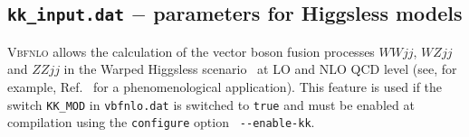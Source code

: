 \documentclass[english,12pt]{article}
\begin{document}

\subsection{{\tt kk\_input.dat} $-$ parameters for Higgsless models}

\textsc{Vbfnlo} allows the calculation of the vector boson fusion processes
$WWjj$, $WZjj$ and $ZZjj$ in the Warped Higgsless scenario~\cite{Csaki:2003zu,
Englert:2008wp} at LO and NLO QCD level (see, for example,
Ref.~\cite{Englert:2008tn} for a phenomenological application). This feature is
used if the switch {\tt KK\_MOD} in {\tt vbfnlo.dat} is switched to {\tt true}
and must be enabled at compilation using the {\tt configure} option {\tt
-{}-enable-kk}.
\end{document}
